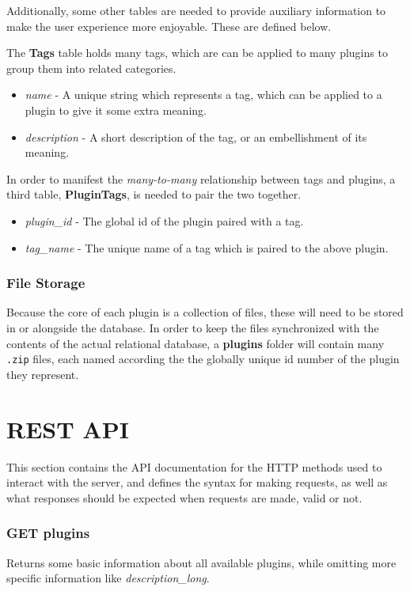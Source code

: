 \documentclass[a4paper, 12pt]{article}
\begin{document}
		Additionally, some other tables are needed to provide auxiliary information to make the user experience more enjoyable. These are defined below.

		The \textbf{Tags} table holds many tags, which are can be applied to many plugins to group them into related categories.

		\begin{itemize}
			\item \emph{name} - A unique string which represents a tag, which can be applied to a plugin to give it some extra meaning.
			\item \emph{description} - A short description of the tag, or an embellishment of its meaning.
		\end{itemize}

		In order to manifest the \emph{many-to-many} relationship between tags and plugins, a third table, \textbf{PluginTags}, is needed to pair the two together.

		\begin{itemize}
			\item \emph{plugin\_id} - The global id of the plugin paired with a tag.
			\item \emph{tag\_name} - The unique name of a tag which is paired to the above plugin.
		\end{itemize}

	\section{File Storage}
		Because the core of each plugin is a collection of files, these will need to be stored in or alongside the database. In order to keep the files synchronized with the contents of the actual relational database, a \textbf{plugins} folder will contain many \verb|.zip| files, each named according the the globally unique id number of the plugin they represent.

\part{REST API}
	This section contains the API documentation for the HTTP methods used to interact with the server, and defines the syntax for making requests, as well as what responses should be expected when requests are made, valid or not.

	\section{GET plugins}
		Returns some basic information about all available plugins, while omitting more specific information like \emph{description\_long}.
\end{document}
